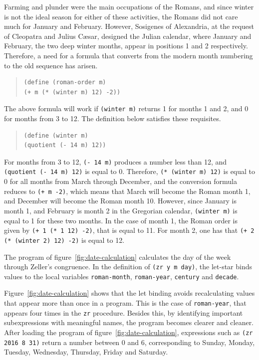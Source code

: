 \documentclass[a4paper,12pt]{book}
\begin{document}
Farming and plunder were the main
occupations of the Romans, and since winter
is not the ideal season for
either of these activities,
the Romans did not care much for
January and February. However,
Sosigenes of Alexandria,
at the request of Cleopatra and
Julius C\ae sar, designed the
Julian calendar, where January
and February, the two deep winter
months, appear in  positions
1 and 2 respectively.
Therefore, a need for a formula
that converts from the modern
month numbering to the
old sequence has arisen.
\begin{quote}
\begin{verbatim}
(define (roman-order m)
(+ m (* (winter m) 12) -2))
\end{verbatim}
\end{quote}
The above formula will work if \verb|(winter m)|
returns 1 for months 1 and 2, and
0 for months from 3 to 12. The definition
below satisfies these requisites.
\begin{quote}
\begin{verbatim}
(define (winter m)
(quotient (- 14 m) 12))
\end{verbatim}
\end{quote}
For months from 3 to 12,
\verb|(- 14 m)| produces a number
less than 12, and \verb|(quotient (- 14 m) 12)|
is equal to 0. Therefore,
\verb|(* (winter m) 12)| is equal to
0 for all months from March through December,
and the conversion formula reduces
to \verb|(+ m -2)|, which means that
March will become the Roman month 1, and December
will become the Roman month 10.
However, since January is month 1,
and February is month 2 in the Gregorian
calendar, \verb|(winter m)| is
equal to 1 for these two months.
In the case of month 1,
the Roman order is given by
\verb|(+ 1 (* 1 12) -2)|, that is
equal to 11. For month 2, one has that
\verb|(+ 2 (* (winter 2) 12) -2)|
is equal to 12.

The program of figure~\ref{fig:date-calculation}
calculates the day of the week
through Zeller's congruence. In the definition
of \verb|(zr y m day)|, the let-star 
binds values to the local variables \verb|roman-month|,
\verb|roman-year|, \verb|century| and \verb|decade|.

Figure~\ref{fig:date-calculation} shows that
the let binding avoids recalculating values that
appear more than once in a program. This
is the case of \verb|roman-year|, that
appears four times in the \verb|zr| procedure.
Besides this, by identifying important
subexpressions with meaningful names, the
program becomes clearer and cleaner.
After loading the program of
figure~\ref{fig:date-calculation},
expressions
such as
\verb|(zr 2016 8 31)| return
a number between 0 and 6, corresponding to
Sunday, Monday, Tuesday, Wednesday,
Thursday, Friday and Saturday.
\end{document}
